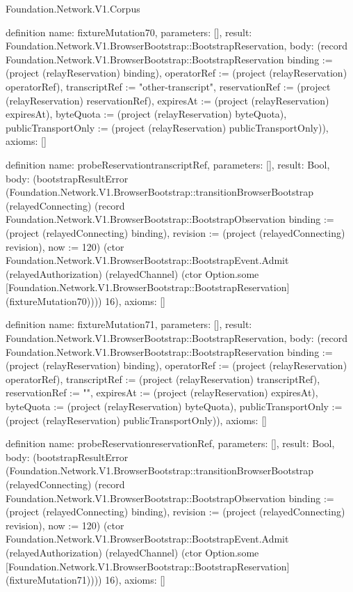 \begin{lexlean}{Foundation.Network.V1.Corpus}
\begin{semanticmodule}
definition{
  name: fixtureMutation70,
  parameters: [],
  result: Foundation.Network.V1.BrowserBootstrap::BootstrapReservation,
  body: (record Foundation.Network.V1.BrowserBootstrap::BootstrapReservation {binding := (project (relayReservation) binding), operatorRef := (project (relayReservation) operatorRef), transcriptRef := "other-transcript", reservationRef := (project (relayReservation) reservationRef), expiresAt := (project (relayReservation) expiresAt), byteQuota := (project (relayReservation) byteQuota), publicTransportOnly := (project (relayReservation) publicTransportOnly)}),
  axioms: []
}

definition{
  name: probeReservationtranscriptRef,
  parameters: [],
  result: Bool,
  body: (bootstrapResultError (Foundation.Network.V1.BrowserBootstrap::transitionBrowserBootstrap (relayedConnecting) (record Foundation.Network.V1.BrowserBootstrap::BootstrapObservation {binding := (project (relayedConnecting) binding), revision := (project (relayedConnecting) revision), now := 120}) (ctor Foundation.Network.V1.BrowserBootstrap::BootstrapEvent.Admit (relayedAuthorization) (relayedChannel) (ctor Option.some [Foundation.Network.V1.BrowserBootstrap::BootstrapReservation] (fixtureMutation70)))) 16),
  axioms: []
}

definition{
  name: fixtureMutation71,
  parameters: [],
  result: Foundation.Network.V1.BrowserBootstrap::BootstrapReservation,
  body: (record Foundation.Network.V1.BrowserBootstrap::BootstrapReservation {binding := (project (relayReservation) binding), operatorRef := (project (relayReservation) operatorRef), transcriptRef := (project (relayReservation) transcriptRef), reservationRef := "", expiresAt := (project (relayReservation) expiresAt), byteQuota := (project (relayReservation) byteQuota), publicTransportOnly := (project (relayReservation) publicTransportOnly)}),
  axioms: []
}

definition{
  name: probeReservationreservationRef,
  parameters: [],
  result: Bool,
  body: (bootstrapResultError (Foundation.Network.V1.BrowserBootstrap::transitionBrowserBootstrap (relayedConnecting) (record Foundation.Network.V1.BrowserBootstrap::BootstrapObservation {binding := (project (relayedConnecting) binding), revision := (project (relayedConnecting) revision), now := 120}) (ctor Foundation.Network.V1.BrowserBootstrap::BootstrapEvent.Admit (relayedAuthorization) (relayedChannel) (ctor Option.some [Foundation.Network.V1.BrowserBootstrap::BootstrapReservation] (fixtureMutation71)))) 16),
  axioms: []
}


\end{semanticmodule}
\end{lexlean}
